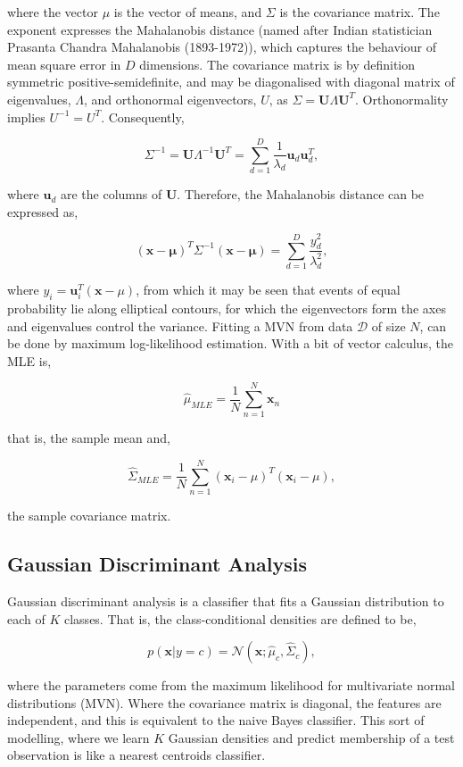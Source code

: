 \documentclass[11pt]{amsart}
\begin{document}
where the vector $\mu$ is the vector of means, and $\Sigma$ is the covariance matrix. The exponent expresses the Mahalanobis distance (named after Indian statistician Prasanta Chandra Mahalanobis (1893-1972)), which captures the behaviour of mean square error in $D$ dimensions. The covariance matrix is by definition symmetric positive-semidefinite, and may be diagonalised with diagonal matrix of eigenvalues, $\Lambda$, and orthonormal eigenvectors, $U$, as $\Sigma = \mathbf{U}\Lambda\mathbf{U}^T$. Orthonormality implies $U^{-1} = U^T$. Consequently,

$$\Sigma^{-1} = \mathbf{U}\Lambda^{-1}\mathbf{U}^T = \sum_{d=1}^D\frac{1}{\lambda_d}\mathbf{u}_d\mathbf{u}_d^T,$$

where $\mathbf{u}_d$ are the columns of $\mathbf{U}$. Therefore, the Mahalanobis distance can be expressed as,

$$(\mathbf{x} - \mathbf{\mu})^T\Sigma^{-1}(\mathbf{x} - \mathbf{\mu}) = \sum_{d=1}^D\frac{y_d^2}{\lambda_d^2},$$

where $y_i = \mathbf{u}_i^T(\mathbf{x} - \mu)$, from which it may be seen that events of equal probability lie along elliptical contours, for which the eigenvectors form the axes and eigenvalues control the variance. Fitting a MVN from data $\mathcal{D}$ of size $N$, can be done by maximum log-likelihood estimation. With a bit of vector calculus, the MLE is,

$$\hat{\mu}_{MLE} = \frac{1}{N}\sum_{n=1}^N\mathbf{x}_n$$

that is, the sample mean and,

$$\hat\Sigma_{MLE} = \frac{1}{N}\sum_{n=1}^N(\mathbf{x}_i - \mu)^T(\mathbf{x}_i - \mu),$$

the sample covariance matrix.

\subsection{Gaussian Discriminant Analysis}

Gaussian discriminant analysis is a classifier that fits a Gaussian distribution to each of $K$ classes. That is, the class-conditional densities are defined to be,

$$p(\mathbf{x} | y = c) = \mathcal{N}(\mathbf{x} ; \hat{\mu}_c, \hat\Sigma_c),$$

where the parameters come from the maximum likelihood for multivariate normal distributions (MVN). Where the covariance matrix is diagonal, the features are independent, and this is equivalent to the naive Bayes classifier. This sort of modelling, where we learn $K$ Gaussian densities and predict membership of a test observation is like a nearest centroids classifier.
\end{document}
